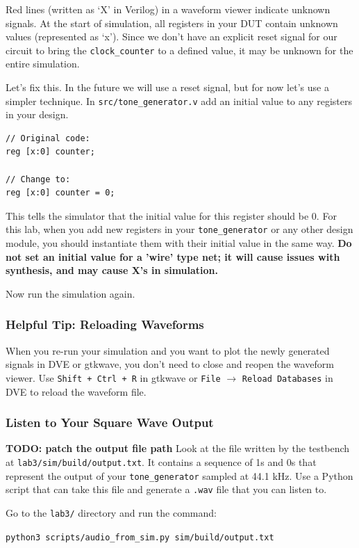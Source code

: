 \documentclass[11pt]{article}
\begin{document}
Red lines (written as `X' in Verilog) in a waveform viewer indicate unknown signals.
At the start of simulation, all registers in your DUT contain unknown values (represented as `x').
Since we don't have an explicit reset signal for our circuit to bring the \verb|clock_counter| to a defined value, it may be unknown for the entire simulation.

Let's fix this. In the future we will use a reset signal, but for now let's use a simpler technique. In \verb|src/tone_generator.v| add an initial value to any registers in your design.
\begin{verbatim}
// Original code:
reg [x:0] counter;

// Change to:
reg [x:0] counter = 0;
\end{verbatim}

This tells the simulator that the initial value for this register should be 0.
For this lab, when you add new registers in your \verb|tone_generator| or any other design module, you should instantiate them with their initial value in the same way.
\textbf{Do not set an initial value for a 'wire' type net; it will cause issues with synthesis, and may cause X's in simulation.}

Now run the simulation again.
\subsubsection{Helpful Tip: Reloading Waveforms}
When you re-run your simulation and you want to plot the newly generated signals in DVE or gtkwave, you don't need to close and reopen the waveform viewer.
Use \verb|Shift + Ctrl + R| in gtkwave or \verb|File| $\rightarrow$ \verb|Reload Databases| in DVE to reload the waveform file.

\subsubsection{Listen to Your Square Wave Output}
\textbf{TODO: patch the output file path}
Look at the file written by the testbench at \verb|lab3/sim/build/output.txt|.
It contains a sequence of 1s and 0s that represent the output of your \verb|tone_generator| sampled at 44.1 kHz.
Use a Python script that can take this file and generate a \verb|.wav| file that you can listen to.

Go to the \verb|lab3/| directory and run the command:

\verb|python3 scripts/audio_from_sim.py sim/build/output.txt|
\end{document}
